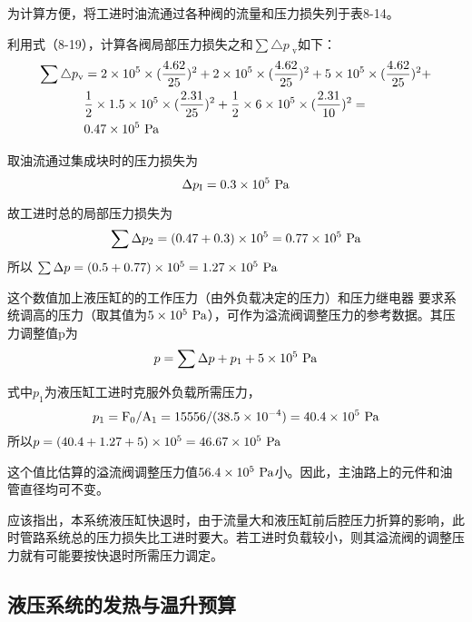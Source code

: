 \documentclass[cn,11pt,chinese]{elegantbook}
\begin{document}
为计算方便，将工进时油流通过各种阀的流量和压力损失列于表8-14。

\noindent 利用式（8-19），计算各阀局部压力损失之和$\sum \triangle p_\text{ v}$如下：
\[
\begin{split}
\sum \triangle p_\text{v}  & = 2\times10^5\times(\frac{4.62}{25})^2+2\times10^5\times(\frac{4.62}{25})^2+5\times10^5\times(\frac{4.62}{25})^2+\\ & \frac{1}{2}\times1.5\times10^5\times(\frac{2.31}{25})^2+\frac{1}{2}\times6\times10^5\times(\frac{2.31}{10})^2 =\\
&0.47\times10^5\rm \ Pa
\end{split}
\]

取油流通过集成块时的压力损失为
\[
\Delta p_\text{I}=0.3\times10^5\rm \ Pa
\]

故工进时总的局部压力损失为
\[
\sum \Delta p_2 =(0.47+0.3)\times10^5 = 0.77\times10^5\rm \ Pa
\]
所以 $\sum \Delta p =(0.5+0.77)\times10^5 = 1.27\times10^5\rm \ Pa$

这个数值加上液压缸的的工作压力（由外负载决定的压力）和压力继电器                                                                                                                                                                                                                                                                                                                                                                                                                                                                                                                                                                          要求系统调高的压力（取其值为$5\times10^5\rm \ Pa$），可作为溢流阀调整压力的参考数据。其压力调整值p为
\[
p=\sum\Delta p+p_1+5\times10^5\rm \ Pa
\]

\noindent 式中$p_1$为液压缸工进时克服外负载所需压力，
\[
p_1=\rm F_0/A_1=15556/(38.5\times10^{-4})=40.4\times10^5\ \rm Pa
\]
所以$p=(40.4+1.27+5)\times10^5=46.67\times10^5\ \rm Pa$

这个值比估算的溢流阀调整压力值$56.4\times10^5\ \rm Pa$小。因此，主油路上的元件和油管直径均可不变。

应该指出，本系统液压缸快退时，由于流量大和液压缸前后腔压力折算的影响，此时管路系统总的压力损失比工进时要大。若工进时负载较小，则其溢流阀的调整压力就有可能要按快退时所需压力调定。

\subsection{液压系统的发热与温升预算}
\end{document}
